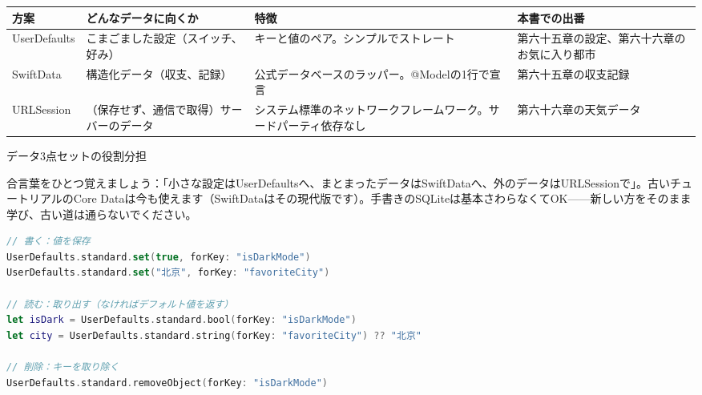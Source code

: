 


\begin{center}
\begin{tabularx}{\linewidth}{|X|X|X|X|}
\hline
\textbf{方案} & \textbf{どんなデータに向くか} & \textbf{特徴} & \textbf{本書での出番} \tabularnewline
\hline
UserDefaults & こまごました設定（スイッチ、好み） & キーと値のペア。シンプルでストレート & 第六十五章の設定、第六十六章のお気に入り都市 \tabularnewline
SwiftData & 構造化データ（収支、記録） & 公式データベースのラッパー。@Modelの1行で宣言 & 第六十五章の収支記録 \tabularnewline
URLSession & （保存せず、通信で取得）サーバーのデータ & システム標準のネットワークフレームワーク。サードパーティ依存なし & 第六十六章の天気データ \tabularnewline
\hline
\end{tabularx}
\end{center}

\begin{center}\small\color{gray}データ3点セットの役割分担\end{center}

合言葉をひとつ覚えましょう：「小さな設定はUserDefaultsへ、まとまったデータはSwiftDataへ、外のデータはURLSessionで」。古いチュートリアルのCore Dataは今も使えます（SwiftDataはその現代版です）。手書きのSQLiteは基本さわらなくてOK——新しい方をそのまま学び、古い道は通らないでください。


\begin{lstlisting}[language=Swift]
// 書く：値を保存
UserDefaults.standard.set(true, forKey: "isDarkMode")
UserDefaults.standard.set("北京", forKey: "favoriteCity")

// 読む：取り出す（なければデフォルト値を返す）
let isDark = UserDefaults.standard.bool(forKey: "isDarkMode")
let city = UserDefaults.standard.string(forKey: "favoriteCity") ?? "北京"

// 削除：キーを取り除く
UserDefaults.standard.removeObject(forKey: "isDarkMode")
\end{lstlisting}

